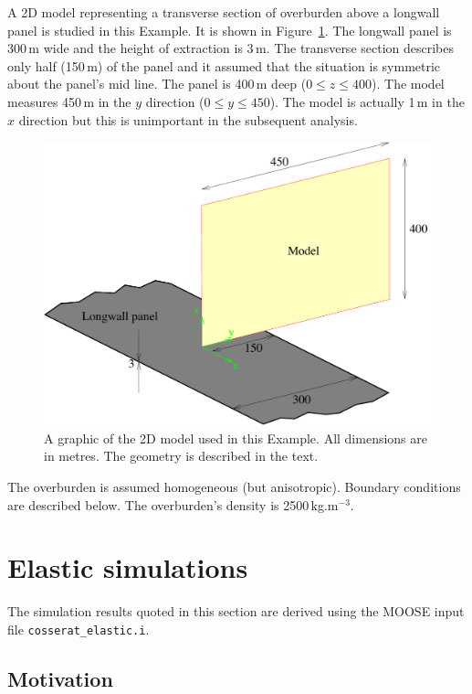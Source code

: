 \documentclass[]{scrreprt}
\begin{document}
A 2D model representing a transverse section of overburden above a
longwall panel is studied in this Example.  It is shown in
Figure~\ref{model_setup.fig}.  The longwall panel is 300\,m wide and the height of
extraction is 3\,m.  The transverse section describes only half
(150\,m) of the panel and it assumed that the situation is symmetric
about the panel's mid line.  The panel is 400\,m deep ($0\leq z\leq 400$).  The model
measures 450\,m in the $y$ direction ($0\leq y\leq 450$).  The model
is actually 1\,m in the $x$ direction but this is unimportant in the
subsequent analysis.

\begin{figure}[htb]
\begin{center}
\includegraphics[width=13cm]{model_seup.pdf}
\caption{A graphic of the 2D model used in this Example.  All
  dimensions are in metres.  The geometry is described in the text.}
\label{model_setup.fig}
\end{center}
\end{figure}

The overburden is assumed homogeneous (but
anisotropic).  Boundary conditions are described below.  The
overburden's density is 2500\,kg.m$^{-3}$.


\chapter{Elastic simulations}
\label{elastic.chap}

The simulation results quoted in this section are derived using the
MOOSE input file {\tt cosserat\_elastic.i}.

\section{Motivation}
\end{document}
